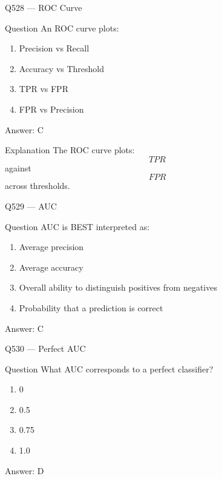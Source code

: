 \documentclass[aspectratio=169,8pt]{beamer}
\begin{document}
\begin{frame}{Q528 --- ROC Curve}
	\begin{block}{Question}
		An ROC curve plots:
		\begin{enumerate}
			\item Precision vs Recall
			\item Accuracy vs Threshold
			\item TPR vs FPR
			\item FPR vs Precision
		\end{enumerate}
	\end{block}
	\begin{exampleblock}{Answer: C}\end{exampleblock}
	\begin{block}{Explanation}
		The ROC curve plots:
		\[
		TPR
		\]
		against
		\[
		FPR
		\]
		across thresholds.
	\end{block}
\end{frame}

\begin{frame}{Q529 --- AUC}
	\begin{block}{Question}
		AUC is BEST interpreted as:
		\begin{enumerate}
			\item Average precision
			\item Average accuracy
			\item Overall ability to distinguish positives from negatives
			\item Probability that a prediction is correct
		\end{enumerate}
	\end{block}
	\begin{exampleblock}{Answer: C}\end{exampleblock}
\end{frame}

\begin{frame}{Q530 --- Perfect AUC}
	\begin{block}{Question}
		What AUC corresponds to a perfect classifier?
		\begin{enumerate}
			\item 0
			\item 0.5
			\item 0.75
			\item 1.0
		\end{enumerate}
	\end{block}
	\begin{exampleblock}{Answer: D}\end{exampleblock}
\end{frame}
\end{document}
